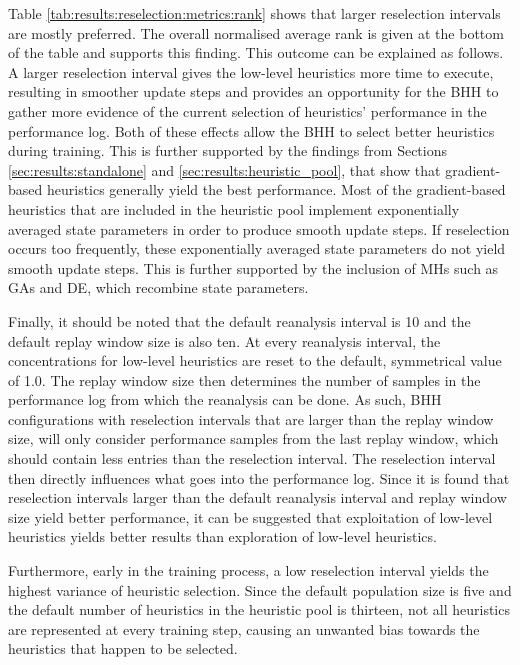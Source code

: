 Table \ref{tab:results:reselection:metrics:rank} shows that larger reselection intervals are mostly preferred. The overall normalised average rank is given at the bottom of the table and supports this finding. This outcome can be explained as follows. A larger reselection interval gives the low-level heuristics more time to execute, resulting in smoother update steps and provides an opportunity for the \acs{BHH} to gather more evidence of the current selection of heuristics' performance in the performance log. Both of these effects allow the \acs{BHH} to select better heuristics during training. This is further supported by the findings from Sections \ref{sec:results:standalone} and \ref{sec:results:heuristic_pool}, that show that gradient-based heuristics generally yield the best performance. Most of the gradient-based heuristics that are included in the heuristic pool implement exponentially averaged state parameters in order to produce smooth update steps. If reselection occurs too frequently, these exponentially averaged state parameters do not yield smooth update steps. This is further supported by the inclusion of \acp{MH} such as \acp{GA} and \acs{DE}, which recombine state parameters.

Finally, it should be noted that the default reanalysis interval is 10 and the default replay window size is also ten. At every reanalysis interval, the concentrations for low-level heuristics are reset to the default, symmetrical value of 1.0. The replay window size then determines the number of samples in the performance log from which the reanalysis can be done. As such, \acs{BHH} configurations with reselection intervals that are larger than the replay window size, will only consider performance samples from the last replay window, which should contain less entries than the reselection interval. The reselection interval then directly influences what goes into the performance log. Since it is found that reselection intervals larger than the default reanalysis interval and replay window size yield better performance, it can be suggested that exploitation of low-level heuristics yields better results than exploration of low-level heuristics.

Furthermore, early in the training process, a low reselection interval yields the highest variance of heuristic selection. Since the default population size is five and the default number of heuristics in the heuristic pool is thirteen, not all heuristics are represented at every training step, causing an unwanted bias towards the heuristics that happen to be             selected.

